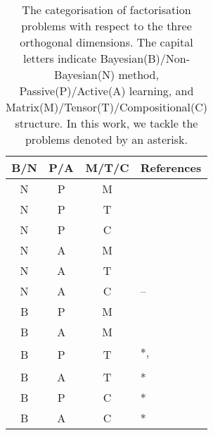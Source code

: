 \begin{table}[t]
\centering
\caption{\label{tbl:relatedwork}The categorisation of factorisation problems with respect to the three orthogonal dimensions. The capital letters indicate Bayesian(B)/Non-Bayesian(N) method, Passive(P)/Active(A) learning, and Matrix(M)/Tensor(T)/Compositional(C) structure. In this work, we tackle the problems denoted by an asterisk.}
\vskip 0.15in
\begin{tabular}{c c c l}
B/N & P/A & M/T/C & References	\\ \hline \hline

N & P & M & \citet{lee1999learning}\\ \hline

\multirow{2}{*}{N} & \multirow{2}{*}{P} & \multirow{2}{*}{T}& \citet{nickel2011three}\\
& & & \citet{kolda2009tensor}\\ \hline

N & P & C & \citet{Neelakantan2015} \\ \hline

N & A & M & \citet{ruchansky2015matrix}\\  \hline

N & A & T & \citet{kajino2015active} \\  \hline

N & A & C & -- \\ \hline

B & P & M & \citet{mnih2007probabilistic}\\ \hline

\multirow{2}{*}{B} & \multirow{2}{*}{A} & \multirow{2}{*}{M}&  \citet{kawale2015efficient} \\
& & & \citet{sutherland2013active}\\ \hline

\multirow{2}{*}{B} & \multirow{2}{*}{P} & \multirow{2}{*}{T}& *, \citet{xiong2010temporal}\\
& & & \citet{schmidt2009probabilistic} \\ \hline

B & A & T & * \\ \hline

B & P & C & * \\ \hline

B & A & C & * \\ 
\end{tabular}
\end{table}

